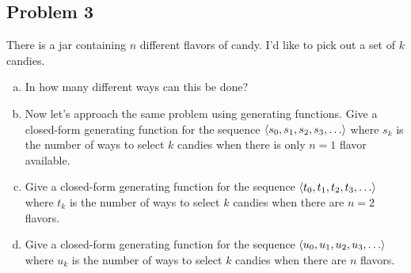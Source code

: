 \documentclass[12pt]{article}
\begin{document}

\newpage

\subsection*{Problem 3}

There is a jar containing $n$ different flavors of candy.  I'd like to
pick out a set of $k$ candies.

\begin{enumerate}[(a)]

\item In how many different ways can this be done?


\item Now let's approach the same problem using generating functions.
Give a closed-form generating function for the sequence $\left\langle s_0,
s_1, s_2, s_3, \ldots\right\rangle$ where $s_k$ is the number of ways to select
$k$ candies when there is only $n = 1$ flavor available.

\solution[\vspace{1.25in}]{
\[
1 + x + x^2 + x^3 + \ldots = \frac{1}{1-x}
\]
}

\item Give a closed-form generating function for the sequence
$\left\langle t_0, t_1, t_2, t_3, \ldots\right\rangle$ where $t_k$ is the number of ways
to select $k$ candies when there are $n = 2$ flavors.

\solution[\vspace{1.25in}]{
\[
(1 + x + x^2 + x^3 + \ldots)^2 = \frac{1}{(1-x)^2}
\]
}

\item Give a closed-form generating function for the sequence
$\left\langle u_0, u_1, u_2, u_3, \ldots\right\rangle$ where $u_k$ is the number of ways
to select $k$ candies when there are $n$ flavors.

\solution[\vspace{1.25in}]{
\[
\frac{1}{(1-x)^n}
\]
}

\end{enumerate}

\end{document}
